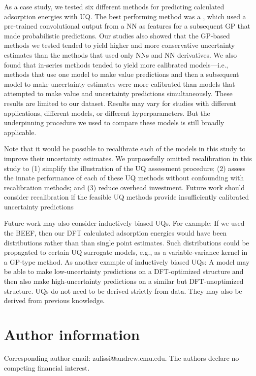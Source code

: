 \documentclass[]{achemso}
\begin{document}
As a case study, we tested six different methods for predicting  calculated adsorption energies with \gls{UQ}.
The best performing method was a , which used a pre-trained convolutional output from a \gls{NN} as features for a subsequent \gls{GP} that made probabilistic predictions.
Our studies also showed that the \gls{GP}-based methods we tested tended to yield higher and more conservative uncertainty estimates than the methods that used only \gls{NN}s and \gls{NN} derivatives.
We also found that in-series methods tended to yield more calibrated models---i.e., methods that use one model to make value predictions and then a subsequent model to make uncertainty estimates were more calibrated than models that attempted to make value and uncertainty predictions simultaneously.
These results are limited to our dataset.
Results may vary for studies with different applications, different models, or different hyperparameters.
But the underpinning procedure we used to compare these models is still broadly applicable.

Note that it would be possible to recalibrate\cite{Kuleshov2018} each of the models in this study to improve their uncertainty estimates.
We purposefully omitted recalibration in this study to (1) simplify the illustration of the \gls{UQ} assessment procedure; (2) assess the innate performance of each of these \gls{UQ} methods without confounding with recalibration methods; and (3) reduce overhead investment.
Future work should consider recalibration if the feasible \gls{UQ} methods provide insufficiently calibrated uncertainty predictions

Future work may also consider inductively biased \gls{UQ}s.
For example:  If we used the \gls{BEEF},\cite{Wellendorff2012} then our \gls{DFT} calculated adsorption energies would have been distributions rather than than single point estimates.
Such distributions could be propagated to certain \gls{UQ} surrogate models, e.g., as a variable-variance kernel in a \gls{GP}-type method.
As another example of inductively biased \gls{UQ}s:  A model may be able to make low-uncertainty predictions on a \gls{DFT}-optimized structure and then also make high-uncertainty predictions on a similar but \gls{DFT}-unoptimized structure.
\gls{UQ}s do not need to be derived strictly from data.
They may also be derived from previous knowledge.



\section*{Author information} Corresponding author email:  zulissi@andrew.cmu.edu.
The authors declare no competing financial interest.
\end{document}
